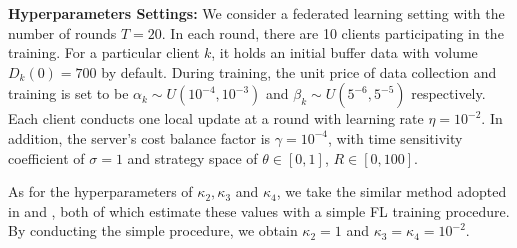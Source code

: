 \documentclass{article}
\theoremstyle{plain}
\theoremstyle{definition}
\theoremstyle{remark}
\begin{document}
\textbf{Hyperparameters Settings: }
We consider a federated learning setting with the number of rounds $T = 20$. In each round, there are 10 clients participating in the training.
For a particular client $k$, it holds an initial buffer data with volume $D_k(0) = 700$ by default. During training, the unit price of data collection and training is set to be $\alpha_k \sim U(10^{-4}, 10^{-3})$ and $\beta_k \sim U(5^{-6}, 5^{-5})$ respectively. Each client conducts one local update at a round with learning rate $\eta=10^{-2}$.
In addition, the server's cost balance factor is $\gamma = 10^{-4}$, with time sensitivity coefficient of $\sigma = 1$ and strategy space of $\theta \in [0, 1]$, $R \in [0, 100]$.

As for the hyperparameters of $\kappa_2, \kappa_3$ and $\kappa_4$, we take the similar method adopted in \cite{wang2019adaptive} and \cite{huang2024collaboration}, both of which estimate these values with a simple FL training procedure.
By conducting the simple procedure, we obtain $\kappa_2 = 1$ and  $\kappa_3 = \kappa_4 = 10^{-2}$.
\end{document}
